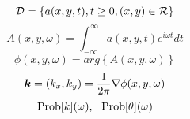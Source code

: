 ﻿%
\begin{equation}
	{\cal D}=\left\{
		a(x,y,t), t\geq 0, (x,y)\in {\cal R}
	\right\}
	\label{eqn:}
\end{equation}
\begin{equation}
	A(x,y,\omega)=\int_{-\infty}^{\infty} a(x,y,t)e^{i\omega t} dt
	\label{eqn:}
\end{equation}
\begin{equation}
	\phi(x,y,\omega)=arg\left\{ A(x,y,\omega) \right\}
	\label{eqn:}
\end{equation}
\begin{equation}
	\fat{k}= (k_x,k_y)= \frac{1}{2\pi} \nabla \phi (x,y,\omega)
	\label{eqn:}
\end{equation}
\begin{equation}
	{\rm Prob} [k](\omega), \ \ 
	{\rm Prob} [\theta](\omega)
	\label{eqn:}
\end{equation}

